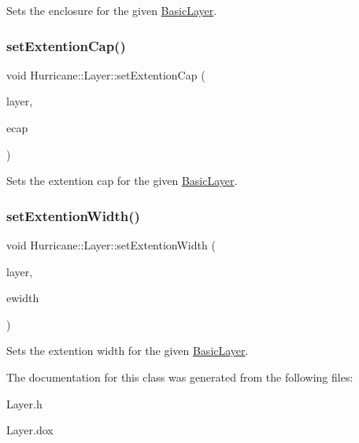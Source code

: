 Sets the enclosure for the given \hyperlink{classHurricane_1_1BasicLayer}{Basic\+Layer}. \mbox{\label{classHurricane_1_1Layer_a55c7b39e000442ea36a0774d26b7fbde}} 
\subsubsection{\texorpdfstring{set\+Extention\+Cap()}{setExtentionCap()}}
{\footnotesize\ttfamily void Hurricane\+::\+Layer\+::set\+Extention\+Cap (\begin{DoxyParamCaption}\item[{const \hyperlink{classHurricane_1_1BasicLayer}{Basic\+Layer} $\ast$}]{layer,  }\item[{\hyperlink{group__DbUGroup_ga4fbfa3e8c89347af76c9628ea06c4146}{Db\+U\+::\+Unit}}]{ecap }\end{DoxyParamCaption})\hspace{0.3cm}{\ttfamily [virtual]}}

Sets the extention cap for the given \hyperlink{classHurricane_1_1BasicLayer}{Basic\+Layer}. \mbox{\label{classHurricane_1_1Layer_a7a6943dbcb3403aff34056cd5de00e66}} 
\subsubsection{\texorpdfstring{set\+Extention\+Width()}{setExtentionWidth()}}
{\footnotesize\ttfamily void Hurricane\+::\+Layer\+::set\+Extention\+Width (\begin{DoxyParamCaption}\item[{const \hyperlink{classHurricane_1_1BasicLayer}{Basic\+Layer} $\ast$}]{layer,  }\item[{\hyperlink{group__DbUGroup_ga4fbfa3e8c89347af76c9628ea06c4146}{Db\+U\+::\+Unit}}]{ewidth }\end{DoxyParamCaption})\hspace{0.3cm}{\ttfamily [virtual]}}

Sets the extention width for the given \hyperlink{classHurricane_1_1BasicLayer}{Basic\+Layer}. 

The documentation for this class was generated from the following files\+:\begin{DoxyCompactItemize}
\item 
Layer.\+h\item 
Layer.\+dox\end{DoxyCompactItemize}
